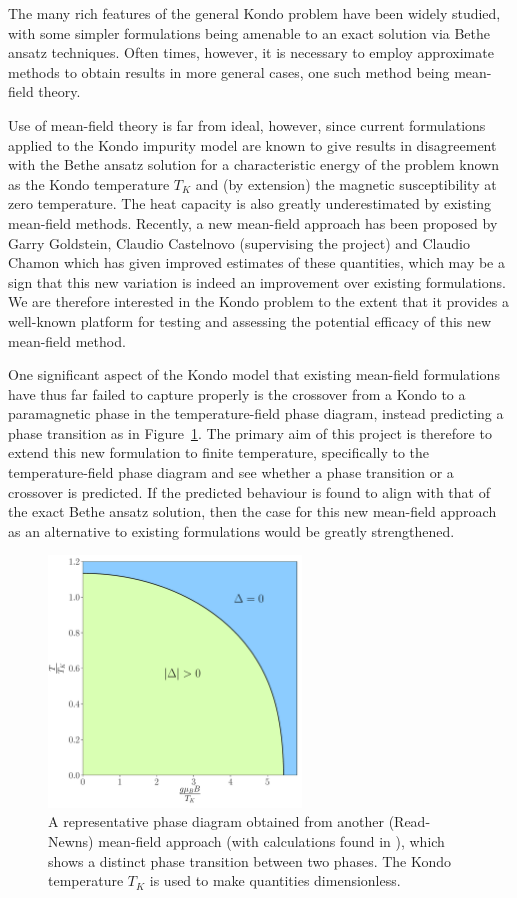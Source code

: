 \documentclass[12pt]{article}
\begin{document}
The many rich features of the general Kondo problem have been widely studied, with some simpler formulations being amenable to an exact solution via Bethe ansatz techniques. Often times, however, it is necessary to employ approximate methods to obtain results in more general cases, one such method being mean-field theory.

Use of mean-field theory is far from ideal, however, since current formulations applied to the Kondo impurity model are known to give results in disagreement with the Bethe ansatz solution for a characteristic energy of the problem known as the Kondo temperature $ T_{K} $ and (by extension) the magnetic susceptibility at zero temperature. The heat capacity is also greatly underestimated by existing mean-field methods. Recently, a new mean-field approach \cite{Draft} has been proposed by Garry Goldstein, Claudio Castelnovo (supervising the project) and Claudio Chamon which has given improved estimates of these quantities, which may be a sign that this new variation is indeed an improvement over existing formulations. We are therefore interested in the Kondo problem to the extent that it provides a well-known platform for testing and assessing the potential efficacy of this new mean-field method.

One significant aspect of the Kondo model that existing mean-field formulations have thus far failed to capture properly is the crossover from a Kondo to a paramagnetic phase in the temperature-field phase diagram, instead predicting a phase transition as in Figure~\ref{fig:phase_diagram}. The primary aim of this project is therefore to extend this new formulation to finite temperature, specifically to the temperature-field phase diagram and see whether a phase transition or a crossover is predicted. If the predicted behaviour is found to align with that of the exact Bethe ansatz solution, then the case for this new mean-field approach as an alternative to existing formulations would be greatly strengthened.

\begin{figure}[ht]
  \centering
  \includegraphics[width=0.6\textwidth]{Figures/phase_diagram.pdf}
  \caption{A representative phase diagram obtained from another (Read-Newns) mean-field approach (with calculations found in \cite{ManyBodyPhysics}), which shows a distinct phase transition between two phases. The Kondo temperature $ T_K $ is used to make quantities dimensionless.}
  \label{fig:phase_diagram}
\end{figure}
\end{document}
